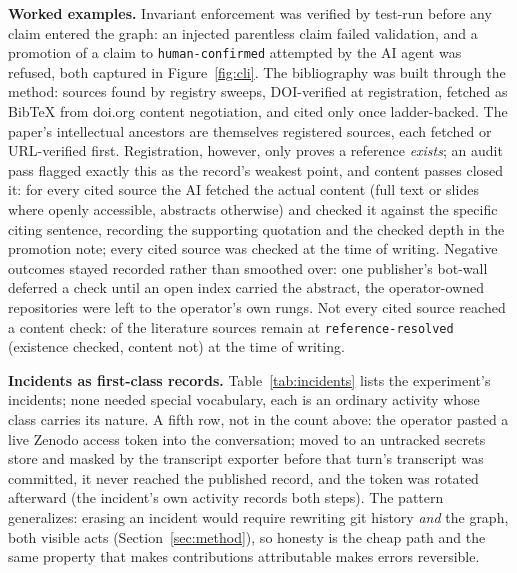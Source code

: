 \textbf{Worked examples.} Invariant enforcement was verified by
test-run before any claim entered the graph: an injected parentless
claim failed validation, and a promotion of a claim to
\texttt{human-confirmed} attempted by the AI agent was refused, both
captured in Figure~\ref{fig:cli}. The
bibliography was built through the method: sources found by registry
sweeps, DOI-verified at registration, fetched as BibTeX from doi.org
content negotiation, and cited only once ladder-backed. The paper's
intellectual ancestors are themselves registered sources, each
fetched or URL-verified first. Registration, however, only proves a
reference
\emph{exists}; an audit pass flagged exactly this as the record's
weakest point, and content passes closed it: for every cited source
the AI fetched the actual content (full text or slides where openly
accessible, abstracts otherwise) and checked it against the specific
citing sentence, recording the supporting quotation and the checked
depth in the promotion note; every cited source was checked at
the time of writing. Negative outcomes stayed recorded rather than
smoothed over: one publisher's bot-wall deferred a check until an
open index carried the abstract, the operator-owned repositories were
left to the operator's own rungs. Not every cited source reached a
content check: \MSrcRefResolved{} of the \MSrcLit{} literature sources
remain at \texttt{reference-resolved} (existence checked, content not)
at the time of writing.

\textbf{Incidents as first-class records.} Table~\ref{tab:incidents}
lists the experiment's incidents; none needed special vocabulary, each
is an ordinary activity whose class carries its nature. A fifth row, not in the count above: the operator pasted a live
Zenodo access token into the conversation; moved to an untracked
secrets store and masked by the transcript exporter before that
turn's transcript was committed, it never reached the published
record, and the token was rotated afterward (the incident's own
activity records both steps). The pattern generalizes: erasing an incident would require
rewriting git history \emph{and} the graph, both visible acts
(Section~\ref{sec:method}), so honesty is the cheap path and the
same property that makes contributions attributable makes errors
reversible.

